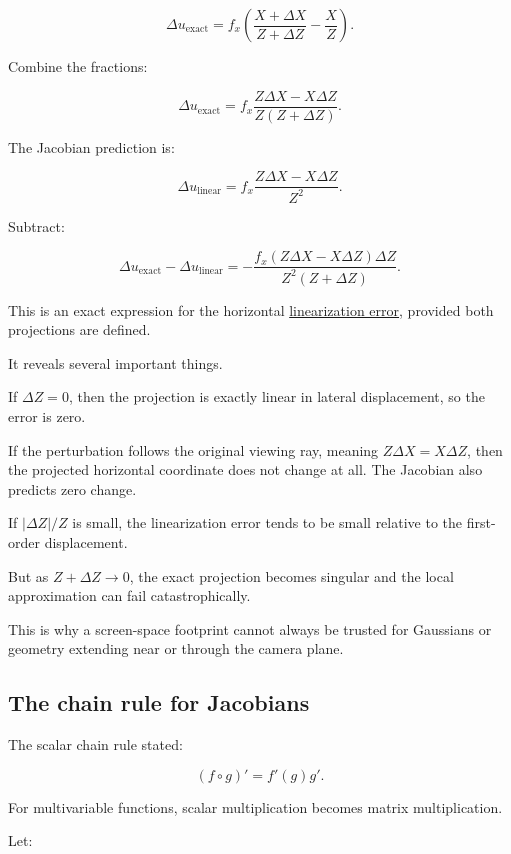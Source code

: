 \[
\Delta u_{\text{exact}} = f_x\left( \frac{X+\Delta X}{Z+\Delta Z} -\frac XZ \right).
\]

Combine the fractions:

\[
\Delta u_{\text{exact}} = f_x\frac{Z\Delta X-X\Delta Z}{Z(Z+\Delta Z)}.
\]

The Jacobian prediction is:

\[
\Delta u_{\text{linear}} = f_x\frac{Z\Delta X-X\Delta Z}{Z^2}.
\]

Subtract:

\[
\boxed{ \Delta u_{\text{exact}}-\Delta u_{\text{linear}} = -\frac{f_x(Z\Delta X-X\Delta Z)\Delta Z} {Z^2(Z+\Delta Z)} }.
\]

This is an exact expression for the horizontal \hyperref[02-foundations-ii-ch021-jacobians-curvature-and-local-approximation]{linearization error}, provided both projections are defined.

It reveals several important things.

If \(\Delta Z=0\), then the projection is exactly linear in lateral displacement, so the error is zero.

If the perturbation follows the original viewing ray, meaning \(Z\Delta X=X\Delta Z\), then the projected horizontal coordinate does not change at all. The Jacobian also predicts zero change.

If \(|\Delta Z|/Z\) is small, the linearization error tends to be small relative to the first-order displacement.

But as \(Z+\Delta Z\to0\), the exact projection becomes singular and the local approximation can fail catastrophically.

This is why a screen-space footprint cannot always be trusted for Gaussians or geometry extending near or through the camera plane.

\subsection{The chain rule for Jacobians}\label{02-foundations-ii-ch021-the-chain-rule-for-jacobians}

\hypertarget{02-foundations-ii-ch021-the-chain-rule-for-jacobians}{}

The scalar chain rule stated:

\[
(f\circ g)'=f'(g)g'.
\]

For multivariable functions, scalar multiplication becomes matrix multiplication.

Let:

